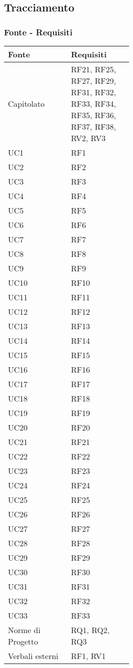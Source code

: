 \subsection{Tracciamento}
\subsubsection{Fonte - Requisiti}
\begin{center}
	\begin{tabular}{ |p{0.25\linewidth}|p{0.25\linewidth}| } 
		\hline
		\textbf{Fonte} & \textbf{Requisiti} \\
		\hline
		Capitolato & RF21, RF25, RF27, RF29, RF31, RF32, RF33, RF34, RF35, RF36, RF37, RF38, RV2, RV3 \\
		\hline
		UC1 & RF1 \\
		\hline
		UC2 & RF2 \\
		\hline
		UC3 & RF3 \\
		\hline
		UC4 & RF4 \\
		\hline
		UC5 & RF5 \\
		\hline
		UC6 & RF6 \\
		\hline
		UC7 & RF7 \\
		\hline
		UC8 & RF8 \\
		\hline
		UC9 & RF9 \\
		\hline
		UC10 & RF10 \\
		\hline
		UC11 & RF11 \\
		\hline
		UC12 & RF12 \\
		\hline
		UC13 & RF13 \\
		\hline
		UC14 & RF14 \\
		\hline
		UC15 & RF15 \\
		\hline
		UC16 & RF16 \\
		\hline
		UC17 & RF17 \\
		\hline
		UC18 & RF18 \\
		\hline
		UC19 & RF19 \\
		\hline
		UC20 & RF20 \\
		\hline
		UC21 & RF21 \\
		\hline
		UC22 & RF22 \\
		\hline
		UC23 & RF23 \\
		\hline
		UC24 & RF24 \\
		\hline
		UC25 & RF25 \\
		\hline
		UC26 & RF26 \\
		\hline
		UC27 & RF27 \\
		\hline
		UC28 & RF28 \\
		\hline
		UC29 & RF29 \\
		\hline
		UC30 & RF30 \\
		\hline
		UC31 & RF31 \\
		\hline
		UC32 & RF32 \\
		\hline
		UC33 & RF33 \\
		\hline
		Norme di Progetto  & RQ1, RQ2, RQ3 \\
		\hline
		Verbali esterni  & RF1, RV1 \\
		\hline
	\end{tabular}
\end{center}

